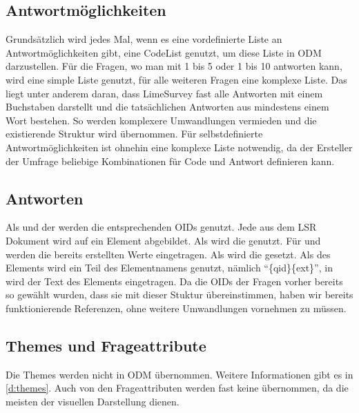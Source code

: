 \subsection{Antwortmöglichkeiten}


Grundsätzlich wird jedes Mal, wenn es eine vordefinierte Liste an Antwortmöglichkeiten gibt, eine CodeList genutzt, um diese Liste in ODM darzustellen.
Für die Fragen, wo man mit 1 bis 5 oder 1 bis 10 antworten kann, wird eine simple Liste genutzt, für alle weiteren Fragen eine komplexe Liste.
Das liegt unter anderem daran, dass LimeSurvey fast alle Antworten mit einem Buchstaben darstellt und die tatsächlichen Antworten aus mindestens einem Wort bestehen.
So werden komplexere Umwandlungen vermieden und die existierende Struktur wird übernommen.
Für selbstdefinierte Antwortmöglichkeiten ist ohnehin eine komplexe Liste notwendig, da der Ersteller der Umfrage beliebige Kombinationen für Code und Antwort definieren kann.

\subsection{Antworten}

Als  und  der  werden die entsprechenden OIDs genutzt.
Jede  aus dem LSR Dokument wird auf ein  Element abgebildet.
Als  wird die  genutzt.
Für  und  werden die bereits erstellten Werte eingetragen.
Als  wird die  gesetzt.
Als  des  Elements wird ein Teil des Elementnamens genutzt, nämlich \enquote{\{qid\}\{ext\}}, in  wird der Text des Elements eingetragen.
Da die OIDs der Fragen vorher bereits so gewählt wurden, dass sie mit dieser Stuktur übereinstimmen, haben wir bereits funktionierende Referenzen, ohne weitere Umwandlungen vornehmen zu müssen.

\subsection{Themes und Frageattribute}


Die Themes werden nicht in ODM übernommen. Weitere Informationen gibt es in \cref{d:themes}.
Auch von den Frageattributen werden fast keine übernommen, da die meisten der visuellen Darstellung dienen.

